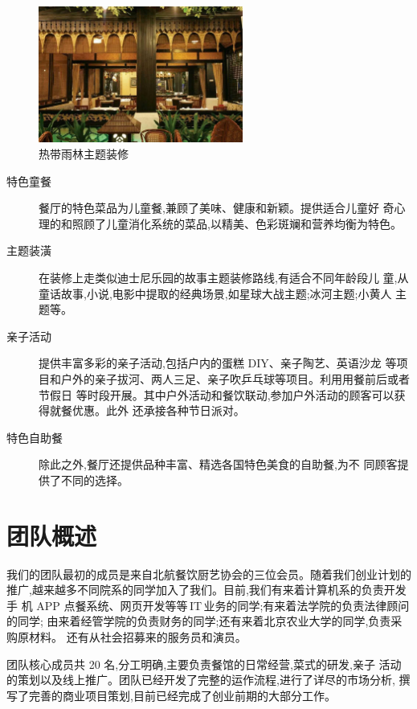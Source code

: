 \begin{figure}[htbp]
        \centering
        \caption{热带雨林主题装修}
        \includegraphics[width=0.6\textwidth]{../images/interior/热带雨林}
\end{figure}

\begin{description}
\item[特色童餐] 餐厅的特色菜品为儿童餐,兼顾了美味、健康和新颖。提供适合儿童好
奇心理的和照顾了儿童消化系统的菜品,以精美、色彩斑斓和营养均衡为特色。

\item[主题装潢] 在装修上走类似迪士尼乐园的故事主题装修路线,有适合不同年龄段儿
童,从童话故事,小说,电影中提取的经典场景,如星球大战主题;冰河主题;小黄人
主题等。

\item[亲子活动] 提供丰富多彩的亲子活动,包括户内的蛋糕 DIY、亲子陶艺、英语沙龙
等项目和户外的亲子拔河、两人三足、亲子吹乒乓球等项目。利用用餐前后或者节假日
等时段开展。其中户外活动和餐饮联动,参加户外活动的顾客可以获得就餐优惠。此外
还承接各种节日派对。

\item[特色自助餐] 除此之外,餐厅还提供品种丰富、精选各国特色美食的自助餐,为不
同顾客提供了不同的选择。
\end{description}

\section{团队概述}
我们的团队最初的成员是来自北航餐饮厨艺协会的三位会员。随着我们创业计划的
推广,越来越多不同院系的同学加入了我们。目前,我们有来着计算机系的负责开发手
机 APP 点餐系统、网页开发等等\,IT\,业务的同学;有来着法学院的负责法律顾问的同学;
由来着经管学院的负责财务的同学;还有来着北京农业大学的同学,负责采购原材料。
还有从社会招募来的服务员和演员。

团队核心成员共 20 名,分工明确,主要负责餐馆的日常经营,菜式的研发,亲子
活动的策划以及线上推广。团队已经开发了完整的运作流程,进行了详尽的市场分析,
撰写了完善的商业项目策划,目前已经完成了创业前期的大部分工作。

